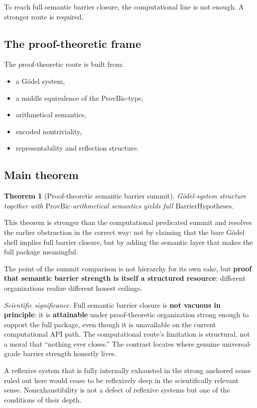 \documentclass[11pt]{article}
\theoremstyle{plain}
\newtheorem{theorem}{Theorem}[section]
\theoremstyle{definition}
\theoremstyle{remark}
\newcommand{\ProvBic}{\mathrm{ProvBic}}
\begin{document}
To reach full semantic barrier closure, the computational line is not enough. A stronger route is required.

\subsection{The proof-theoretic frame}

The proof-theoretic route is built from:
\begin{itemize}
\item a Gödel system,
\item a middle equivalence of the \(\ProvBic\)-type,
\item arithmetical semantics,
\item encoded nontriviality,
\item representability and reflection structure.
\end{itemize}

\subsection{Main theorem}

\begin{theorem}[Proof-theoretic semantic barrier summit]
Gödel-system structure together with \(\ProvBic\)-arithmetical semantics yields full \(\mathrm{BarrierHypotheses}\).
\end{theorem}

This theorem is stronger than the computational predicated summit and resolves the earlier obstruction in the correct way: not by claiming that the bare Gödel shell implies full barrier closure, but by adding the semantic layer that makes the full package meaningful.

The point of the summit comparison is not hierarchy for its own sake, but \textbf{proof that semantic barrier strength is itself a structured resource}: different organizations realize different honest ceilings.

\textit{Scientific significance.} Full semantic barrier closure is \textbf{not vacuous in principle}: it is \textbf{attainable} under proof-theoretic organization strong enough to support the full package, even though it is unavailable on the current computational API path. The computational route's limitation is structural, not a moral that ``nothing ever closes.'' The contrast locates where genuine universal-grade barrier strength honestly lives.

\begin{keybox}[title=Depth consequence]
A reflexive system that is fully internally exhausted in the strong anchored sense ruled out here would cease to be reflexively deep in the scientifically relevant sense. Nonexhaustibility is not a defect of reflexive systems but one of the conditions of their depth.
\end{keybox}
\end{document}
